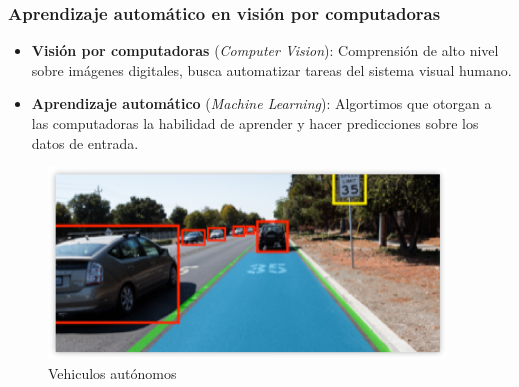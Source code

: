 \documentclass[10pt,center]{beamer}
\begin{document}
\begin{frame}
  \frametitle{Aprendizaje automático en visión por computadoras}
  \begin{itemize}
    \item \textbf{Visión por computadoras} (\textit{Computer Vision}): Comprensión de alto nivel sobre imágenes digitales, busca automatizar tareas del sistema visual humano.
    \item \textbf{Aprendizaje automático} (\textit{Machine Learning}): Algortimos que otorgan a las computadoras la habilidad de aprender y hacer predicciones sobre los datos de entrada. 
  \end{itemize}
  
  \begin{figure}[H]
  \captionsetup[subfigure]{labelformat=empty}
    \begin{center}
      \includegraphics[height=0.4\textheight]{./img/nvidia_car_detection.png}
    \end{center}
    \caption{Vehiculos autónomos}
  \end{figure}    
\end{frame}
  
\end{document}
